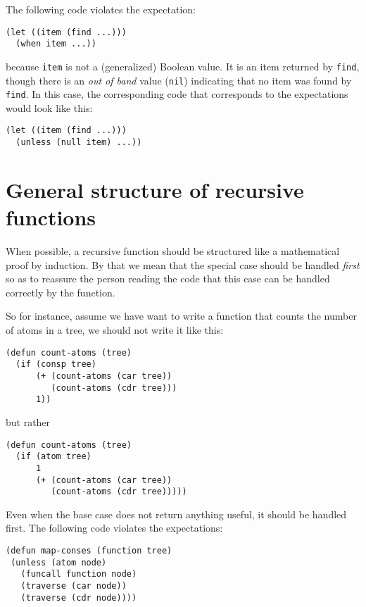 The following code violates the expectation:

\begin{verbatim}
(let ((item (find ...)))
  (when item ...))
\end{verbatim}

because \texttt{item} is not a (generalized) Boolean value.  It is an
item returned by \texttt{find}, though there is an \emph{out of band}
value (\texttt{nil}) indicating that no item was found by
\texttt{find}.  In this case, the corresponding code that corresponds
to the expectations would look like this:

\begin{verbatim}
(let ((item (find ...)))
  (unless (null item) ...))
\end{verbatim}

\section{General structure of recursive functions}

When possible, a recursive function should be structured like a
mathematical proof by induction.  By that we mean that the special
case should be handled \emph{first} so as to reassure the person
reading the code that this case can be handled correctly by the
function.


So for instance, assume we have want to write a function that counts
the number of atoms in a tree, we should not write it like this:

\begin{verbatim}
(defun count-atoms (tree)
  (if (consp tree)
      (+ (count-atoms (car tree))
         (count-atoms (cdr tree)))
      1))
\end{verbatim}

but rather

\begin{verbatim}
(defun count-atoms (tree)
  (if (atom tree)
      1
      (+ (count-atoms (car tree))
         (count-atoms (cdr tree)))))
\end{verbatim}

Even when the base case does not return anything useful, it should be
handled first.  The following code violates the expectations:

\begin{verbatim}
(defun map-conses (function tree)
 (unless (atom node)
   (funcall function node)
   (traverse (car node))
   (traverse (cdr node))))
\end{verbatim}

